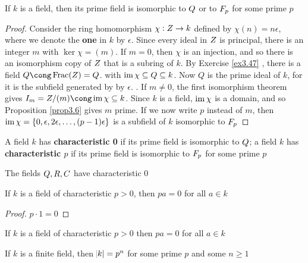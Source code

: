\documentclass[11pt]{article}
\DeclareMathOperator{\Frac}{Frac}
\begin{document}
\begin{proposition}[]
If \(k\) is a field, then its prime field is isomorphic to \(\relax{Q}\) or to \(\relax{F}_p\)
for some prime \(p\)
\end{proposition}

\begin{proof}
Consider the ring homomorphism \(\chi:\relax{Z}\to k\) defined by \(\chi(n)=n\epsilon\),
where we denote the \textbf{one} in \(k\) by \(\epsilon\). Since every ideal in \(\relax{Z}\) is
principal, there is an integer \(m\) with \(\ker\chi=(m)\). If \(m=0\), then
\(\chi\) is an injection, and so there is an isomorphism copy of \(\relax{Z}\) that is a
subring of \(k\). By Exercise \ref{ex3.47} , there is a field
\(Q\cong\Frac(\Z)=\Q\). with \(\operatorname{im}\chi\subseteq Q\subseteq k\). Now \(Q\)
is the prime ideal of \(k\), for it is the subfield generated by by \(\epsilon\). 
. If \(m\neq0\), the first isomorphism theorem gives
\(\I_m=\Z/(m)\cong\im\chi\subseteq k\). Since \(k\) is a field, \(\operatorname{im}\chi\) is
a domain, and so Proposition \ref{prop3.6} gives \(m\) prime. If we now write \(p\)
instead of \(m\), then \(\operatorname{im}\chi=\{0,\epsilon,2\epsilon,\dots,(p-1)\epsilon\}\) is a
subfield of \(k\) isomorphic to \(\relax{F}_p\)
\end{proof}

\begin{definition}[]
A field \(k\) has \textbf{characteristic 0} if its prime field is isomorphic to \(\relax{Q}\);
a field \(k\) has \textbf{characteristic \(p\)} if its prime field is isomorphic to
\(\relax{F}_p\) for some prime \(p\)
\end{definition}

The fields \(\relax{Q},\relax{R},\relax{C}\) have characteristic 0

\begin{proposition}[]
If \(k\) is a field of characteristic \(p>0\), then \(pa=0\) for all \(a\in k\)
\end{proposition}

\begin{proof}
\(p\cdot 1=0\)
\end{proof}

\begin{proposition}[]
If \(k\) is a field of characteristic \(p>0\) then \(pa=0\) for all \(a\in k\)
\end{proposition}

\begin{proposition}[]
If \(k\) is a finite field, then \(\abs{k}=p^n\) for some prime \(p\) and some \(n\ge1\)
\end{proposition}
\end{document}
